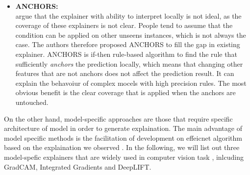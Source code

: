 \begin{itemize}
    \item \textbf{ANCHORS:} \\ \citet{Ribeiro2018Anchors} argue that the explainer with ability to interpret locally is not ideal, as the coverage of these explainers is not clear. People tend to assume that the condition can be applied on other unseens instances, which is not always the case. The authors therefore proposed ANCHORS to fill the gap in existing explainer. ANCHORS is if-then rule-based algorithm to find the rule that sufficiently \textit{anchors} the prediction locally, which means that changing other features that are not anchors does not affect the prediction result. It can explain the behavoiur of complex mocels with high precision rules. The most obvious benefit is the clear coverage that is applied when the anchors are untouched.
\end{itemize}

On the other hand, model-specific approaches are those that require specific architecture of model in order to generate explaination. The main advantage of model specific methods is the facilitation of development on effeicnet algorithm based on the explaination we observed \citep{Belle2020XAIPriciples}. In the following, we will list out three model-spefic explainers that are widely used in computer vision task \citep{Spinner2020explAIner}, inlcuding GradCAM\citep{Selvaraju2017GradCAM}, Integrated Gradients\citep{Sundararajan2017IntegratedGradient} and DeepLIFT\citep{Shrikumar2017DeepLIFT}.


